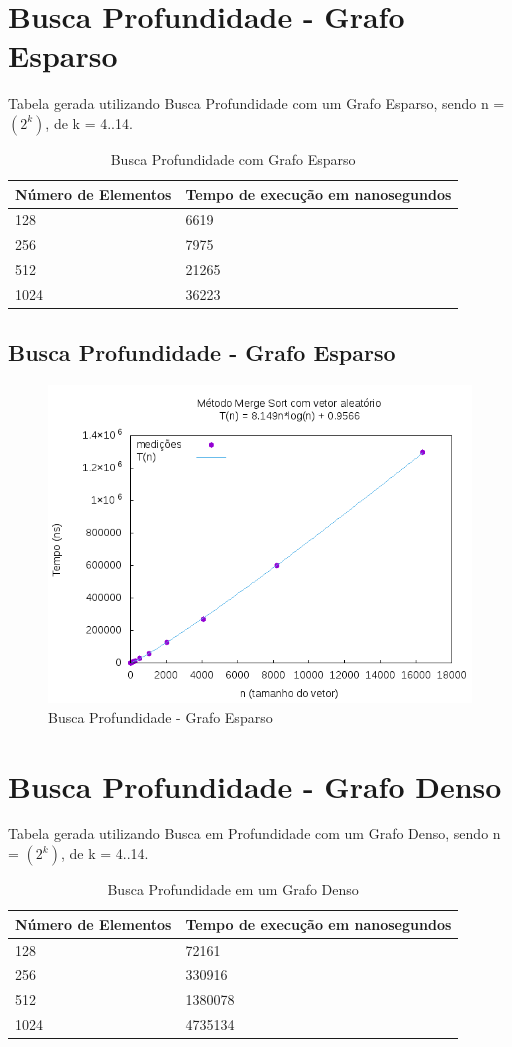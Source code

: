 \documentclass[12pt,a4paper,twoside]{report}
\begin{document}
\section{Busca Profundidade - Grafo Esparso}
Tabela gerada utilizando Busca Profundidade com um Grafo Esparso, sendo n = $(2^k)$, de k = 4..14.
\begin{table}[H]
\centering
\caption{Busca Profundidade com Grafo Esparso}
\label{my-label}
\begin{tabular}{|l|l|}
\hline
\multicolumn{1}{|c|}{\textbf{Número de Elementos}} & \multicolumn{1}{c|}{\textbf{Tempo de execução em nanosegundos}} \\ \hline
128 & 6619 \\ \hline
256 & 7975 \\ \hline
512 & 21265 \\ \hline
1024 & 36223 \\ \hline
\end{tabular}
\end{table}

\subsection{Busca Profundidade - Grafo Esparso}
\begin{figure}[H]
    \centering
    \includegraphics[width=0.7\linewidth]{graficos/MergeSort/vIntAleatorio/vIntAleatorio.png}
  \caption{Busca Profundidade - Grafo Esparso}
\end{figure}

\section{Busca Profundidade - Grafo Denso}
Tabela gerada utilizando Busca em Profundidade com um Grafo Denso, sendo n = $(2^k)$, de k = 4..14.
\begin{table}[H]
\centering
\caption{Busca Profundidade em um Grafo Denso}
\label{my-label}
\begin{tabular}{|l|l|}
\hline
\multicolumn{1}{|c|}{\textbf{Número de Elementos}} & \multicolumn{1}{c|}{\textbf{Tempo de execução em nanosegundos}} \\ \hline
128 & 72161 \\ \hline
256 & 330916 \\ \hline
512 & 1380078 \\ \hline
1024 & 4735134 \\ \hline
\end{tabular}
\end{table}
\end{document}
